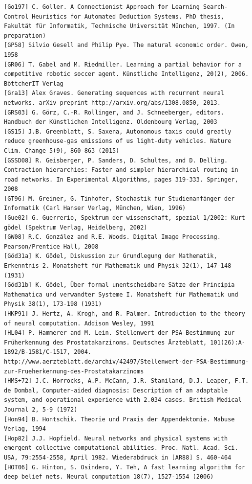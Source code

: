 \documentclass[10pt]{book}
\begin{document}
\begin{center}
\begin{enumerate}
\begin{center}
\begin{center}
\begin{center}
\begin{center}
\begin{center}
\begin{verbatim}
[Go197] C. Goller. A Connectionist Approach for Learning Search-Control Heuristics for Automated Deduction Systems. PhD thesis, Fakultät für Informatik, Technische Universität München, 1997. (In preparation)
[GP58] Silvio Gesell and Philip Pye. The natural economic order. Owen, 1958
[GR06] T. Gabel and M. Riedmiller. Learning a partial behavior for a competitive robotic soccer agent. Künstliche Intelligenz, 20(2), 2006. BöttcherIT Verlag
[Gra13] Alex Graves. Generating sequences with recurrent neural networks. arXiv preprint http://arxiv.org/abs/1308.0850, 2013.
[GRS03] G. Görz, C.-R. Rollinger, and J. Schneeberger, editors. Handbuch der Künstlichen Intelligenz. Oldenbourg Verlag, 2003
[GS15] J.B. Greenblatt, S. Saxena, Autonomous taxis could greatly reduce greenhouse-gas emissions of us light-duty vehicles. Nature Clim. Change 5(9), 860-863 (2015)
[GSSD08] R. Geisberger, P. Sanders, D. Schultes, and D. Delling. Contraction hierarchies: Faster and simpler hierarchical routing in road networks. In Experimental Algorithms, pages 319-333. Springer, 2008
[GT96] M. Greiner, G. Tinhofer, Stochastik für Studienanfänger der Informatik (Carl Hanser Verlag, München, Wien, 1996)
[Gue02] G. Guerrerio, Spektrum der wissenschaft, spezial 1/2002: Kurt gödel (Spektrum Verlag, Heidelberg, 2002)
[GW08] R.C. González and R.E. Woods. Digital Image Processing. Pearson/Prentice Hall, 2008
[Göd31a] K. Gödel, Diskussion zur Grundlegung der Mathematik, Erkenntnis 2. Monatsheft für Mathematik und Physik 32(1), 147-148 (1931)
[Göd31b] K. Gödel, Über formal unentscheidbare Sätze der Principia Mathematica und verwandter Systeme I. Monatsheft für Mathematik und Physik 38(1), 173-198 (1931)
[HKP91] J. Hertz, A. Krogh, and R. Palmer. Introduction to the theory of neural computation. Addison Wesley, 1991
[HL04] P. Hammerer and M. Lein. Stellenwert der PSA-Bestimmung zur Früherkennung des Prostatakarzinoms. Deutsches Ärzteblatt, 101(26):A-1892/B-1581/C-1517, 2004. http://www.aerzteblatt.de/archiv/42497/Stellenwert-der-PSA-Bestimmung-zur-Frueherkennung-des-Prostatakarzinoms
[HMS+72] J.C. Horrocks, A.P. McCann, J.R. Staniland, D.J. Leaper, F.T. de Dombal, Computer-aided diagnosis: Description of an adaptable system, and operational experience with 2.034 cases. British Medical Journal 2, 5-9 (1972)
[Hon94] B. Hontschik. Theorie und Praxis der Appendektomie. Mabuse Verlag, 1994
[Hop82] J.J. Hopfield. Neural networks and physical systems with emergent collective computational abilities. Proc. Natl. Acad. Sci. USA, 79:2554-2558, April 1982. Wiederabdruck in [AR88] S. 460-464
[HOT06] G. Hinton, S. Osindero, Y. Teh, A fast learning algorithm for deep belief nets. Neural computation 18(7), 1527-1554 (2006)

\end{verbatim}
\end{center}
\end{center}
\end{center}
\end{center}
\end{center}
\end{enumerate}
\end{center}
\end{document}
